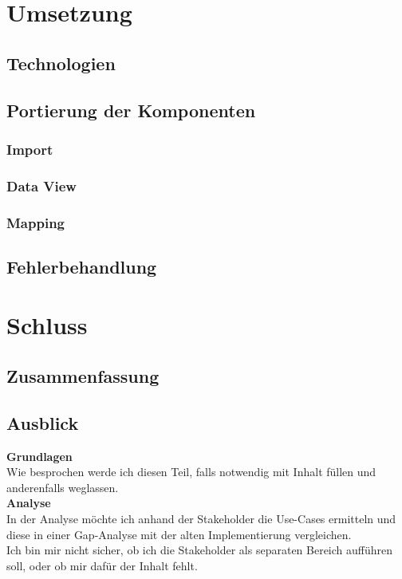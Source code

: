 \documentclass[11pt,a4paper]{article}
\begin{document}
	\section{Umsetzung}
	\subsection{Technologien}
	\subsection{Portierung der Komponenten}
	\subsubsection{Import}
	\subsubsection{Data View}
	\subsubsection{Mapping}
	\subsection{Fehlerbehandlung}
	
	\section{Schluss}
	\subsection{Zusammenfassung}
	\subsection{Ausblick}
	
	\newpage
	\textbf{Grundlagen}\\
	Wie besprochen werde ich diesen Teil, falls notwendig mit Inhalt füllen und anderenfalls weglassen.\\
	
	\textbf{Analyse}\\
	In der Analyse möchte ich anhand der Stakeholder die Use-Cases ermitteln und diese in einer Gap-Analyse mit der alten Implementierung vergleichen.\\
	Ich bin mir nicht sicher, ob ich die Stakeholder als separaten Bereich aufführen soll, oder ob mir dafür der Inhalt fehlt.\\
	
\end{document}
